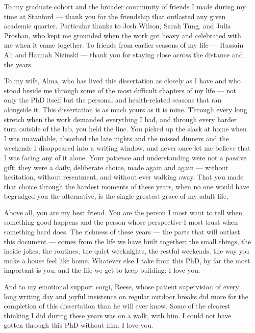 To my graduate cohort and the broader community of friends I made during my time at Stanford --- thank you for the friendship that outlasted any given academic quarter. Particular thanks to Josh Wilson, Sarah Tung, and Julia Proshan, who kept me grounded when the work got heavy and celebrated with me when it came together. To friends from earlier seasons of my life --- Hussain Ali and Hannah Nizinski --- thank you for staying close across the distance and the years.

To my wife, Alma, who has lived this dissertation as closely as I have and who stood beside me through some of the most difficult chapters of my life --- not only the PhD itself but the personal and health-related seasons that ran alongside it. This dissertation is as much yours as it is mine. Through every long stretch when the work demanded everything I had, and through every harder turn outside of the lab, you held the line. You picked up the slack at home when I was unavailable, absorbed the late nights and the missed dinners and the weekends I disappeared into a writing window, and never once let me believe that I was facing any of it alone. Your patience and understanding were not a passive gift; they were a daily, deliberate choice, made again and again --- without hesitation, without resentment, and without ever walking away. That you made that choice through the hardest moments of these years, when no one would have begrudged you the alternative, is the single greatest grace of my adult life.

Above all, you are my best friend. You are the person I most want to tell when something good happens and the person whose perspective I most trust when something hard does. The richness of these years --- the parts that will outlast this document --- comes from the life we have built together: the small things, the inside jokes, the routines, the quiet weeknights, the restful weekends, the way you make a house feel like home. Whatever else I take from this PhD, by far the most important is you, and the life we get to keep building. I love you.

And to my emotional support corgi, Reese, whose patient supervision of every long writing day and joyful insistence on regular outdoor breaks did more for the completion of this dissertation than he will ever know. Some of the clearest thinking I did during these years was on a walk, with him. I could not have gotten through this PhD without him. I love you. 

\bigskip

